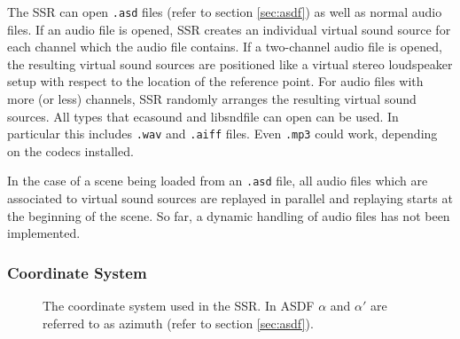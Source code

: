 The SSR can open \texttt{.asd} files (refer to section \ref{sec:asdf}) as well
as normal audio files. If an audio file is opened, SSR creates an individual
virtual sound source for each channel which the audio file contains. If a
two-channel audio file is opened, the resulting virtual sound sources are
positioned like a virtual stereo loudspeaker setup with respect to the location
of the reference point. For audio files with more (or less) channels, SSR randomly
arranges the resulting virtual sound sources.
All types that
ecasound and libsndfile can open can be used. In particular this includes \texttt{.wav} and \texttt{.aiff} files.
Even \texttt{.mp3} could work, depending on the codecs installed.

In the case of a scene being loaded from an \texttt{.asd} file, all audio files
which are associated to virtual sound sources are replayed in parallel and
replaying starts at the beginning of the scene. So far, a dynamic handling of
audio files has not been implemented.

\subsubsection{Coordinate System}

\begin{figure}
  
 
 
\begin{center}
 \hfill
{}
\caption{\label{fig:coordinate_system}{The coordinate system used in the SSR.
In ASDF $\alpha$ and $\alpha'$ are referred to as azimuth (refer to section
\ref{sec:asdf}).}}
\end{center}
\end{figure}

